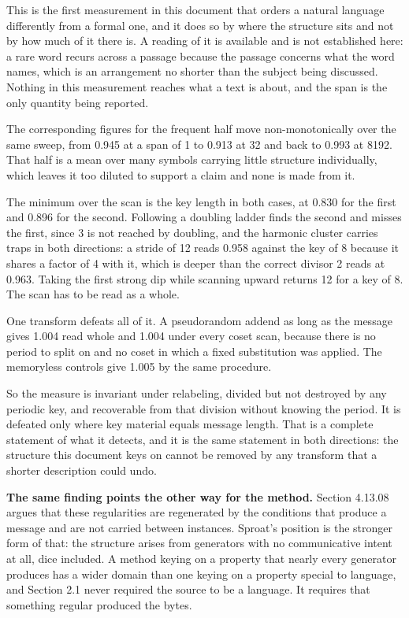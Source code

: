 This is the first measurement in this document that orders a natural language differently from a formal one, and it does so by where the structure sits and not by how much of it there is. A reading of it is available and is not established here: a rare word recurs across a passage because the passage concerns what the word names, which is an arrangement no shorter than the subject being discussed. Nothing in this measurement reaches what a text is about, and the span is the only quantity being reported.

The corresponding figures for the frequent half move non-monotonically over the same sweep, from 0.945 at a span of 1 to 0.913 at 32 and back to 0.993 at 8192. That half is a mean over many symbols carrying little structure individually, which leaves it too diluted to support a claim and none is made from it.

The minimum over the scan is the key length in both cases, at 0.830 for the first and 0.896 for the second. Following a doubling ladder finds the second and misses the first, since 3 is not reached by doubling, and the harmonic cluster carries traps in both directions: a stride of 12 reads 0.958 against the key of 8 because it shares a factor of 4 with it, which is deeper than the correct divisor 2 reads at 0.963. Taking the first strong dip while scanning upward returns 12 for a key of 8. The scan has to be read as a whole.

One transform defeats all of it. A pseudorandom addend as long as the message gives 1.004 read whole and 1.004 under every coset scan, because there is no period to split on and no coset in which a fixed substitution was applied. The memoryless controls give 1.005 by the same procedure.

So the measure is invariant under relabeling, divided but not destroyed by any periodic key, and recoverable from that division without knowing the period. It is defeated only where key material equals message length. That is a complete statement of what it detects, and it is the same statement in both directions: the structure this document keys on cannot be removed by any transform that a shorter description could undo.

\noindent\textbf{The same finding points the other way for the method.} Section 4.13.08 argues that these regularities are regenerated by the conditions that produce a message and are not carried between instances. Sproat's position is the stronger form of that: the structure arises from generators with no communicative intent at all, dice included. A method keying on a property that nearly every generator produces has a wider domain than one keying on a property special to language, and Section 2.1 never required the source to be a language. It requires that something regular produced the bytes.

